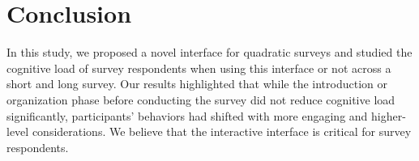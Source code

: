 \section{Conclusion}
In this study, we proposed a novel interface for quadratic surveys and studied the cognitive load of survey respondents when using this interface or not across a short and long survey. Our results highlighted that while the introduction or organization phase before conducting the survey did not reduce cognitive load significantly, participants' behaviors had shifted with more engaging and higher-level considerations. We believe that the interactive interface is critical for survey respondents.
